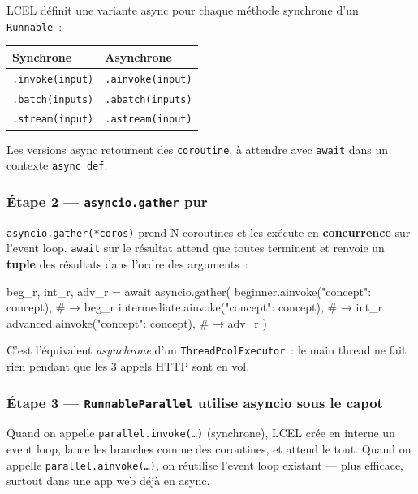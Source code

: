 \documentclass[11pt,a4paper]{article}
\begin{document}
LCEL définit une variante async pour chaque méthode synchrone d'un
\texttt{Runnable}~:

\begin{center}
\begin{tabular}{ll}
\toprule
\textbf{Synchrone} & \textbf{Asynchrone} \\
\midrule
\texttt{.invoke(input)}      & \texttt{.ainvoke(input)} \\
\texttt{.batch(inputs)}      & \texttt{.abatch(inputs)} \\
\texttt{.stream(input)}      & \texttt{.astream(input)} \\
\bottomrule
\end{tabular}
\end{center}

Les versions async retournent des \texttt{coroutine}, à attendre avec
\texttt{await} dans un contexte \texttt{async def}.

\subsubsection*{Étape 2 — \texttt{asyncio.gather} pur}

\texttt{asyncio.gather(*coros)} prend N coroutines et les exécute en
\textbf{concurrence} sur l'event loop. \texttt{await} sur le résultat
attend que toutes terminent et renvoie un \textbf{tuple} des résultats
dans l'ordre des arguments~:

\begin{pythoncode}
beg_r, int_r, adv_r = await asyncio.gather(
    beginner.ainvoke({"concept": concept}),     # → beg_r
    intermediate.ainvoke({"concept": concept}), # → int_r
    advanced.ainvoke({"concept": concept}),     # → adv_r
)
\end{pythoncode}

C'est l'équivalent \emph{asynchrone} d'un \texttt{ThreadPoolExecutor}~:
le main thread ne fait rien pendant que les 3 appels HTTP sont en vol.

\subsubsection*{Étape 3 — \texttt{RunnableParallel} utilise asyncio sous le capot}

Quand on appelle \texttt{parallel.invoke(\dots)} (synchrone), LCEL crée
en interne un event loop, lance les branches comme des coroutines, et
attend le tout. Quand on appelle \texttt{parallel.ainvoke(\dots)}, on
réutilise l'event loop existant — plus efficace, surtout dans une app
web déjà en async.
\end{document}

